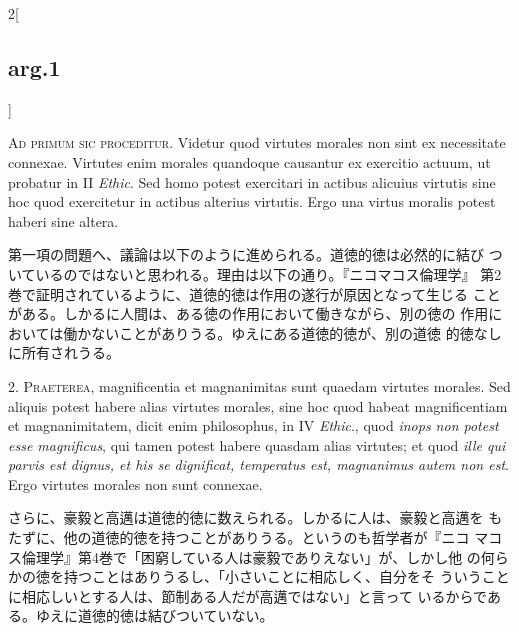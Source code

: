\documentclass[paper=a4paper,fontsize=10pt,jafontsize=9pt,titlepage]{jlreq}
\begin{document}
\begin{paracol}{2}[\subsection{arg.1}]

{\scshape Ad primum sic proceditur}. Videtur quod virtutes morales non
sint ex necessitate connexae. Virtutes enim morales quandoque
causantur ex exercitio actuum, ut probatur in II {\itshape Ethic}. Sed
homo potest exercitari in actibus alicuius virtutis sine hoc quod
exercitetur in actibus alterius virtutis. Ergo una virtus moralis
potest haberi sine altera.

\switchcolumn

第一項の問題へ、議論は以下のように進められる。道徳的徳は必然的に結び
 ついているのではないと思われる。理由は以下の通り。『ニコマコス倫理学』
 第2巻で証明されているように、道徳的徳は作用の遂行が原因となって生じる
 ことがある。しかるに人間は、ある徳の作用において働きながら、別の徳の
 作用においては働かないことがありうる。ゆえにある道徳的徳が、別の道徳
 的徳なしに所有されうる。


2. {\scshape Praeterea}, magnificentia et magnanimitas sunt quaedam
virtutes morales. Sed aliquis potest habere alias virtutes morales,
sine hoc quod habeat magnificentiam et magnanimitatem, dicit enim
philosophus, in IV {\itshape Ethic}., quod {\itshape inops non potest
esse magnificus}, qui tamen potest habere quasdam alias virtutes; et
quod {\itshape ille qui parvis est dignus, et his se dignificat,
temperatus est, magnanimus autem non est}. Ergo virtutes morales non
sunt connexae.

\switchcolumn

さらに、豪毅と高邁は道徳的徳に数えられる。しかるに人は、豪毅と高邁を
 もたずに、他の道徳的徳を持つことがありうる。というのも哲学者が『ニコ
 マコス倫理学』第4巻で「困窮している人は豪毅でありえない」が、しかし他
 の何らかの徳を持つことはありうるし、「小さいことに相応しく、自分をそ
 ういうことに相応しいとする人は、節制ある人だが高邁ではない」と言って
 いるからである。ゆえに道徳的徳は結びついていない。



\end{paracol}
\end{document}
